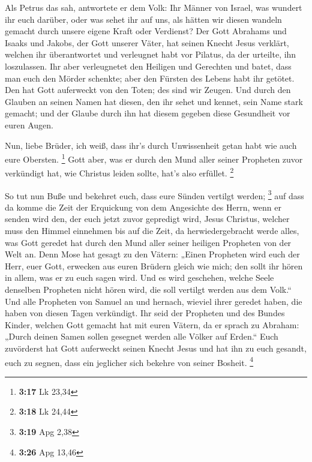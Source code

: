  Als Petrus das sah, antwortete er dem Volk: Ihr Männer von
Israel, was wundert ihr euch darüber, oder was sehet ihr auf uns, als
hätten wir diesen wandeln gemacht durch unsere eigene Kraft oder
Verdienst?  Der Gott Abrahams und Isaaks und Jakobs, der
Gott unserer Väter, hat seinen Knecht Jesus verklärt, welchen ihr
überantwortet und verleugnet habt vor Pilatus, da der urteilte, ihn
loszulassen.  Ihr aber verleugnetet den Heiligen und
Gerechten und batet, dass man euch den Mörder schenkte; 
aber den Fürsten des Lebens habt ihr getötet. Den hat Gott auferweckt
von den Toten; des sind wir Zeugen.  Und durch den Glauben
an seinen Namen hat diesen, den ihr sehet und kennet, sein Name stark
gemacht; und der Glaube durch ihn hat diesem gegeben diese Gesundheit
vor euren Augen.

 Nun, liebe Brüder, ich weiß, dass ihr's durch Unwissenheit
getan habt wie auch eure Obersten. \footnote{\textbf{3:17} Lk 23,34}
 Gott aber, was er durch den Mund aller seiner Propheten
zuvor verkündigt hat, wie Christus leiden sollte, hat's also erfüllet.
\footnote{\textbf{3:18} Lk 24,44}

 So tut nun Buße und bekehret euch, dass eure Sünden
vertilgt werden; \footnote{\textbf{3:19} Apg 2,38}  auf
dass da komme die Zeit der Erquickung von dem Angesichte des Herrn, wenn
er senden wird den, der euch jetzt zuvor gepredigt wird, Jesus Christus,
 welcher muss den Himmel einnehmen bis auf die Zeit, da
herwiedergebracht werde alles, was Gott geredet hat durch den Mund aller
seiner heiligen Propheten von der Welt an.  Denn Mose hat
gesagt zu den Vätern: „Einen Propheten wird euch der Herr, euer Gott,
erwecken aus euren Brüdern gleich wie mich; den sollt ihr hören in
allem, was er zu euch sagen wird.  Und es wird geschehen,
welche Seele denselben Propheten nicht hören wird, die soll vertilgt
werden aus dem Volk.``  Und alle Propheten von Samuel an
und hernach, wieviel ihrer geredet haben, die haben von diesen Tagen
verkündigt.  Ihr seid der Propheten und des Bundes Kinder,
welchen Gott gemacht hat mit euren Vätern, da er sprach zu Abraham:
„Durch deinen Samen sollen gesegnet werden alle Völker auf Erden.``
 Euch zuvörderst hat Gott auferweckt seinen Knecht Jesus
und hat ihn zu euch gesandt, euch zu segnen, dass ein jeglicher sich
bekehre von seiner Bosheit. \footnote{\textbf{3:26} Apg 13,46}

